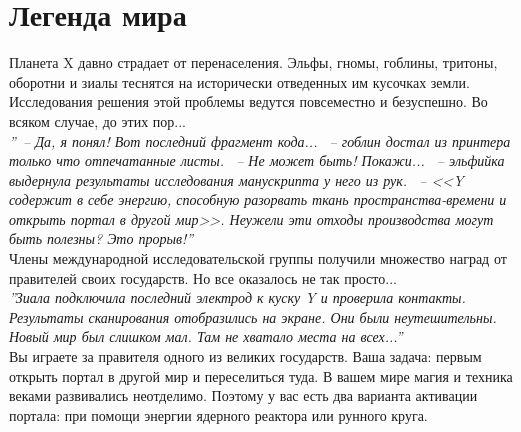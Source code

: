 \documentclass[a4paper,12pt,landscape]{article}
\begin{document}
  \section{Легенда мира}
  Планета X давно страдает от перенаселения. Эльфы, гномы, гоблины, тритоны, оборотни и зиалы теснятся на исторически отведенных им кусочках земли. Исследования решения этой проблемы ведутся повсеместно и безуспешно. Во всяком случае, до этих пор...
~\\  

\textit{''~-- Да, я понял! Вот последний фрагмент кода... ~-- гоблин достал из принтера только что отпечатанные листы.
~-- Не может быть! Покажи... ~-- эльфийка выдернула результаты исследования манускрипта у него из рук. ~-- <<Y содержит в себе энергию, способную разорвать ткань пространства-времени и открыть портал в другой мир>>. Неужели эти отходы производства могут быть полезны? Это прорыв!''}
~\\  

Члены международной исследовательской группы получили множество наград от правителей своих государств. Но все оказалось не так просто...
~\\

\textit{''Зиала подключила последний электрод к куску Y и проверила контакты. Результаты сканирования отобразились на экране. Они были неутешительны. Новый мир был слишком мал. Там не хватало места на всех...''}
~\\

Вы играете за правителя одного из великих государств. Ваша задача: первым открыть портал в другой мир и переселиться туда. В вашем мире магия и техника веками развивались неотделимо. Поэтому у вас есть два варианта активации портала: при помощи энергии ядерного реактора или рунного круга.
\end{document}
